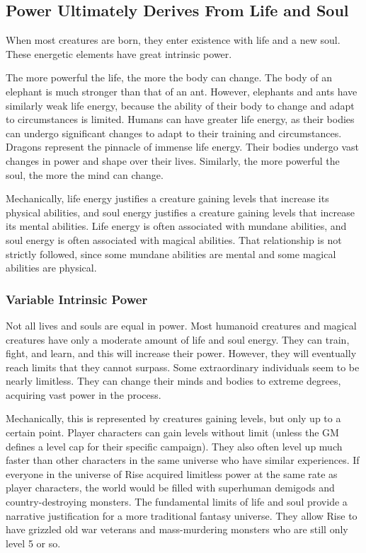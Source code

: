   \subsection{Power Ultimately Derives From Life and Soul}
    When most creatures are born, they enter existence with life and a new soul.
    These energetic elements have great intrinsic power.

    The more powerful the life, the more the body can change.
    The body of an elephant is much stronger than that of an ant.
    However, elephants and ants have similarly weak life energy, because the ability of their body to change and adapt to circumstances is limited.
    Humans can have greater life energy, as their bodies can undergo significant changes to adapt to their training and circumstances.
    Dragons represent the pinnacle of immense life energy.
    Their bodies undergo vast changes in power and shape over their lives.
    Similarly, the more powerful the soul, the more the mind can change.

    Mechanically, life energy justifies a creature gaining levels that increase its physical abilities, and soul energy justifies a creature gaining levels that increase its mental abilities.
    Life energy is often associated with mundane abilities, and soul energy is often associated with magical abilities.
    That relationship is not strictly followed, since some mundane abilities are mental and some magical abilities are physical.

    \subsubsection{Variable Intrinsic Power}
      Not all lives and souls are equal in power.
      Most humanoid creatures and magical creatures have only a moderate amount of life and soul energy.
      They can train, fight, and learn, and this will increase their power.
      However, they will eventually reach limits that they cannot surpass.
      Some extraordinary individuals seem to be nearly limitless.
      They can change their minds and bodies to extreme degrees, acquiring vast power in the process.

      Mechanically, this is represented by creatures gaining levels, but only up to a certain point.
      Player characters can gain levels without limit (unless the GM defines a level cap for their specific campaign).
      They also often level up much faster than other characters in the same universe who have similar experiences.
      If everyone in the universe of Rise acquired limitless power at the same rate as player characters, the world would be filled with superhuman demigods and country-destroying monsters.
      The fundamental limits of life and soul provide a narrative justification for a more traditional fantasy universe.
      They allow Rise to have grizzled old war veterans and mass-murdering monsters who are still only level 5 or so.

